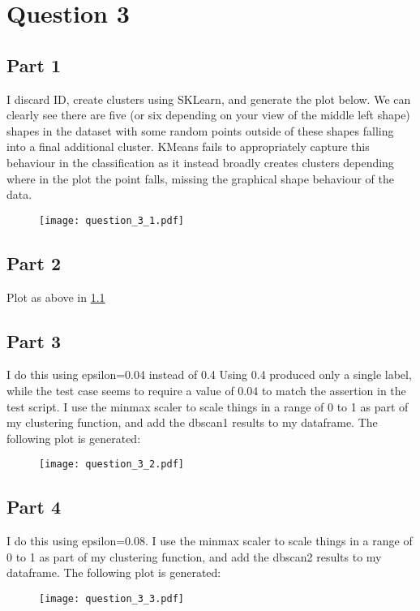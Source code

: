 \documentclass{scrreprt}
\begin{document}
\newpage
\chapter{Question 3}

\section{Part 1}\label{E3Q1}
I discard ID, create clusters using SKLearn, and generate the plot below. We can clearly see there are five (or six depending on your view of the middle left shape) shapes in the dataset with some random points outside of these shapes falling into a final additional cluster. KMeans fails to appropriately capture this behaviour in the classification as it instead broadly creates clusters depending where in the plot the point falls, missing the graphical shape behaviour of the data.
\begin{figure}[h!]
	\centering
	\texttt{[image: question\_3\_1.pdf]}
\end{figure}


\section{Part 2}\label{E3Q2}
Plot as above in \ref{E3Q1}

\section{Part 3}\label{E3Q3}
I do this using epsilon=0.04 instead of 0.4 Using 0.4 produced only a single label, while the test case seems to require a value of 0.04 to match the assertion in the test script. I use the minmax scaler to scale things in a range of 0 to 1 as part of my clustering function, and add the dbscan1 results to my dataframe. The following plot is generated:
\begin{figure}[h!]
	\centering
	\texttt{[image: question\_3\_2.pdf]}
\end{figure}


\section{Part 4}\label{E3Q4}
I do this using epsilon=0.08. I use the minmax scaler to scale things in a range of 0 to 1 as part of my clustering function, and add the dbscan2 results to my dataframe. The following plot is generated:
\begin{figure}[h!]
	\centering
	\texttt{[image: question\_3\_3.pdf]}
\end{figure}
\end{document}
